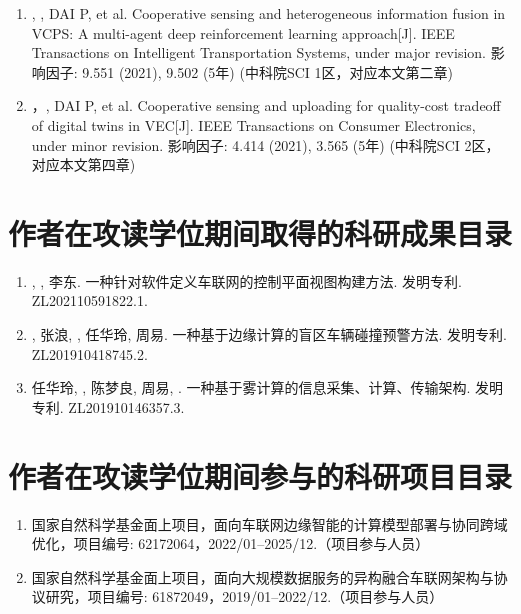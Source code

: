 \begin{enumerate}
	\item \textbf{}, , DAI P, et al. Cooperative sensing and heterogeneous information fusion in VCPS: A multi-agent deep reinforcement learning approach[J]. IEEE Transactions on Intelligent Transportation Systems, under major revision. 影响因子: 9.551 (2021), 9.502 (5年) (中科院SCI 1区，对应本文第二章)
	\item {}，\textbf{}, DAI P, et al. Cooperative sensing and uploading for quality-cost tradeoff of digital twins in VEC[J]. IEEE Transactions on Consumer Electronics, under minor revision. 影响因子: 4.414 (2021), 3.565 (5年) (中科院SCI 2区，对应本文第四章) 
\end{enumerate}

\section[\hspace{-2pt}作者在攻读学位期间取得的科研成果目录]{{ \hspace{-8pt}作者在攻读学位期间取得的科研成果目录}}
\begin{enumerate}
	\item \textbf{}, , 李东. 一种针对软件定义车联网的控制平面视图构建方法. 发明专利. ZL202110591822.1.
	\item {}, 张浪, \textbf{}, 任华玲, 周易. 一种基于边缘计算的盲区车辆碰撞预警方法. 发明专利. ZL201910418745.2.
	\item 任华玲, , 陈梦良, 周易, \textbf{}. 一种基于雾计算的信息采集、计算、传输架构. 发明专利. ZL201910146357.3.
\end{enumerate}

\section[\hspace{-2pt}作者在攻读学位期间参与的科研项目目录]{{ \hspace{-8pt}作者在攻读学位期间参与的科研项目目录}}
\begin{enumerate}
	\item 国家自然科学基金面上项目，面向车联网边缘智能的计算模型部署与协同跨域优化，项目编号: 62172064，2022/01–2025/12.（项目参与人员）
	\item 国家自然科学基金面上项目，面向大规模数据服务的异构融合车联网架构与协议研究，项目编号: 61872049，2019/01–2022/12.（项目参与人员）
\end{enumerate}

